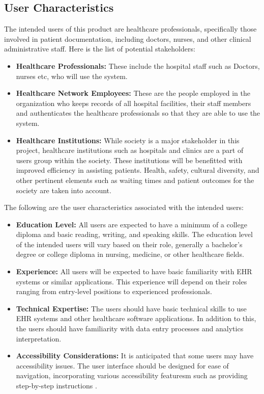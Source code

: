 \documentclass[12pt]{article}
\begin{document}
\subsection{User Characteristics} \label{sec_UserCharacteristics}

The intended users of this product are healthcare professionals, specifically those involved in patient documentation, including doctors, nurses, and other clinical administrative staff. Here is the list of potential stakeholders:\\

\begin{itemize}
  \item\textbf{Healthcare Professionals:} These include the hospital staff such as Doctors, nurses etc, who will use the system.
  \item\textbf{Healthcare Network Employees:} These are the people employed in the organization who keeps records of all hospital facilities, their staff members and authenticates the healthcare professionals so that they are able to use the system.
  \item\textbf{Healthcare Institutions:} While society is a major stakeholder in this project, healthcare institutions such as hospitals and clinics are a part of users group within the society. These institutions will be benefitted with improved efficiency in assisting patients. Health, safety, cultural diversity, and other pertinent elements such as waiting times and patient outcomes for the society are taken into account.  
\end{itemize}

The following are the user characteristics associated with the intended users:\\

\begin{itemize}
  \item\textbf{Education Level:} All users are expected to have a minimum of a college diploma and basic reading, writing, and speaking skills. The education level of the intended users will vary based on their role, generally a bachelor's degree or college diploma in nursing, medicine, or other healthcare fields. \\
  \item\textbf{Experience:} All users will be expected to have basic familiarity with EHR systems or similar applications. This experience will depend on their roles ranging from entry-level positions to experienced professionals. \\
  \item\textbf{Technical Expertise:} The users should have basic technical skills to use EHR systems and other healthcare software applications. In addition to this, the users should have familiarity with data entry processes and analytics interpretation. \\
  \item\textbf{Accessibility Considerations:} It is anticipated that some users may have accessibility issues. The user interface should be designed for ease of navigation, incorporating various accessibility featuresm such as providing step-by-step instructions .\\
\end{itemize}
\end{document}
